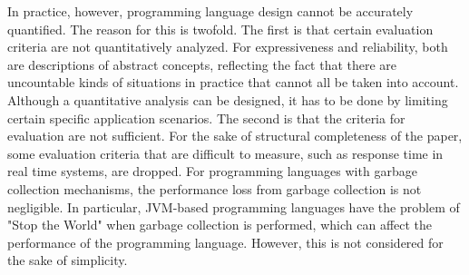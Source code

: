 In practice, however, programming language design cannot be accurately quantified. The reason for this is twofold. The first is that certain evaluation criteria are not quantitatively analyzed. For expressiveness and reliability, both are descriptions of abstract concepts, reflecting the fact that there are uncountable kinds of situations in practice that cannot all be taken into account. Although a quantitative analysis can be designed, it has to be done by limiting certain specific application scenarios. The second is that the criteria for evaluation are not sufficient. For the sake of structural completeness of the paper, some evaluation criteria that are difficult to measure, such as response time in real time systems, are dropped. For programming languages with garbage collection mechanisms, the performance loss from garbage collection is not negligible. In particular, JVM-based programming languages have the problem of "Stop the World" when garbage collection is performed, which can affect the performance of the programming language. However, this is not considered for the sake of simplicity.


